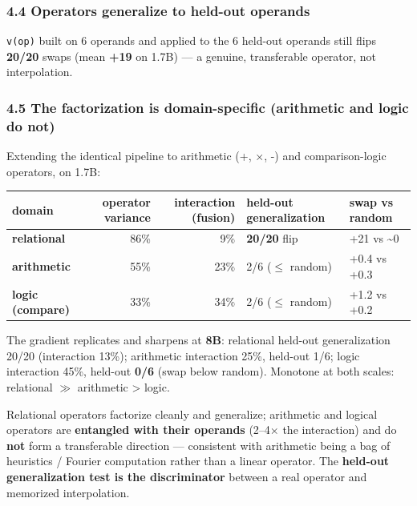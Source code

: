 \subsubsection{4.4 Operators generalize to held-out
operands}\label{44-operators-generalize-to-held-out-operands}

\texttt{v(op)} built on 6 operands and applied to the 6 held-out
operands still flips \textbf{20/20} swaps (mean \textbf{+19} on 1.7B)
--- a genuine, transferable operator, not interpolation.

\subsubsection{4.5 The factorization is domain-specific (arithmetic and
logic do
not)}\label{45-the-factorization-is-domain-specific-arithmetic-and-logic-do-not}

Extending the identical pipeline to arithmetic (+, \ensuremath{\times}, -) and
comparison-logic operators, on 1.7B:

{
\begin{longtable}[]{@{}lrrll@{}}
\toprule\noalign{}
domain & operator variance & interaction (fusion) & held-out
generalization & swap vs random \\
\midrule\noalign{}
\endhead
\bottomrule\noalign{}
\endlastfoot
\textbf{relational} & 86\% & 9\% & \textbf{20/20} flip & +21 vs
\textasciitilde0 \\
\textbf{arithmetic} & 55\% & 23\% & 2/6 (\ensuremath{\leq} random) & +0.4 vs +0.3 \\
\textbf{logic (compare)} & 33\% & 34\% & 2/6 (\ensuremath{\leq} random) & +1.2 vs
+0.2 \\
\end{longtable}
}

The gradient replicates and sharpens at \textbf{8B}: relational held-out
generalization 20/20 (interaction 13\%); arithmetic interaction 25\%,
held-out 1/6; logic interaction 45\%, held-out \textbf{0/6} (swap below
random). Monotone at both scales: relational \ensuremath{\gg} arithmetic \textgreater{}
logic.

Relational operators factorize cleanly and generalize; arithmetic and
logical operators are \textbf{entangled with their operands} (2--4\ensuremath{\times} the
interaction) and do \textbf{not} form a transferable direction ---
consistent with arithmetic being a bag of heuristics / Fourier
computation rather than a linear operator. The \textbf{held-out
generalization test is the discriminator} between a real operator and
memorized interpolation.

